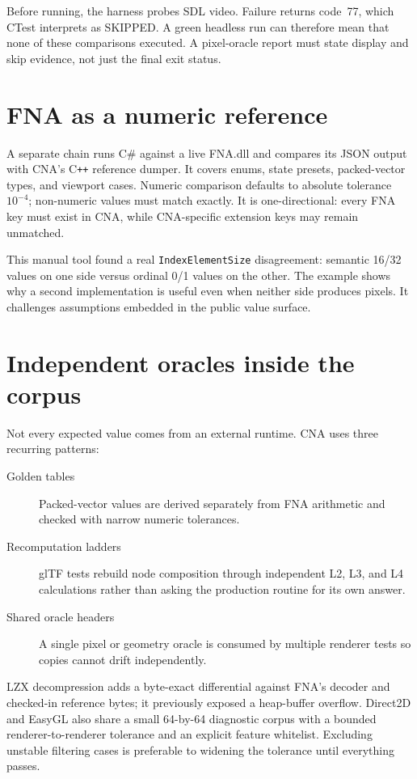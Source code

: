 Before running, the harness probes SDL video.  Failure returns code~77, which CTest interprets as
SKIPPED.  A green headless run can therefore mean that none of these comparisons executed.  A
pixel-oracle report must state display and skip evidence, not just the final exit status.

\section{FNA as a numeric reference}

A separate chain runs C\# against a live FNA.dll and compares its JSON output with CNA's C\texttt{++}
reference dumper.  It covers enums, state presets, packed-vector types, and viewport cases.
Numeric comparison defaults to absolute tolerance $10^{-4}$; non-numeric values must match
exactly.  It is one-directional: every FNA key must exist in CNA, while CNA-specific extension
keys may remain unmatched.

This manual tool found a real \texttt{IndexElementSize} disagreement: semantic 16/32 values on
one side versus ordinal 0/1 values on the other.  The example shows why a second implementation
is useful even when neither side produces pixels.  It challenges assumptions embedded in the
public value surface.

\section{Independent oracles inside the corpus}

Not every expected value comes from an external runtime.  CNA uses three recurring patterns:

\begin{description}
  \item[Golden tables] Packed-vector values are derived separately from FNA arithmetic and
        checked with narrow numeric tolerances.
  \item[Recomputation ladders] glTF tests rebuild node composition through independent L2, L3,
        and L4 calculations rather than asking the production routine for its own answer.
  \item[Shared oracle headers] A single pixel or geometry oracle is consumed by multiple
        renderer tests so copies cannot drift independently.
\end{description}

LZX decompression adds a byte-exact differential against FNA's decoder and checked-in reference
bytes; it previously exposed a heap-buffer overflow.  Direct2D and EasyGL also share a small
64-by-64 diagnostic corpus with a bounded renderer-to-renderer tolerance and an explicit feature
whitelist.  Excluding unstable filtering cases is preferable to widening the tolerance until
everything passes.

